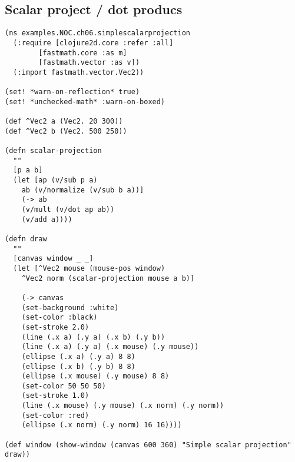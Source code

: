 \documentclass[11pt]{article}
\begin{document}
\subsection{Scalar project / dot producs}
\label{sec:orgaf41ec7}

\begin{verbatim}
(ns examples.NOC.ch06.simplescalarprojection
  (:require [clojure2d.core :refer :all]
	    [fastmath.core :as m]
	    [fastmath.vector :as v])
  (:import fastmath.vector.Vec2))

(set! *warn-on-reflection* true)
(set! *unchecked-math* :warn-on-boxed)

(def ^Vec2 a (Vec2. 20 300))
(def ^Vec2 b (Vec2. 500 250))

(defn scalar-projection
  ""
  [p a b]
  (let [ap (v/sub p a)
	ab (v/normalize (v/sub b a))]
    (-> ab
	(v/mult (v/dot ap ab))
	(v/add a))))

(defn draw
  ""
  [canvas window _ _]
  (let [^Vec2 mouse (mouse-pos window)
	^Vec2 norm (scalar-projection mouse a b)]

    (-> canvas
	(set-background :white)
	(set-color :black)
	(set-stroke 2.0)
	(line (.x a) (.y a) (.x b) (.y b))
	(line (.x a) (.y a) (.x mouse) (.y mouse))
	(ellipse (.x a) (.y a) 8 8)
	(ellipse (.x b) (.y b) 8 8)
	(ellipse (.x mouse) (.y mouse) 8 8)
	(set-color 50 50 50)
	(set-stroke 1.0)
	(line (.x mouse) (.y mouse) (.x norm) (.y norm))
	(set-color :red)
	(ellipse (.x norm) (.y norm) 16 16))))

(def window (show-window (canvas 600 360) "Simple scalar projection" draw))

\end{verbatim}
\end{document}
